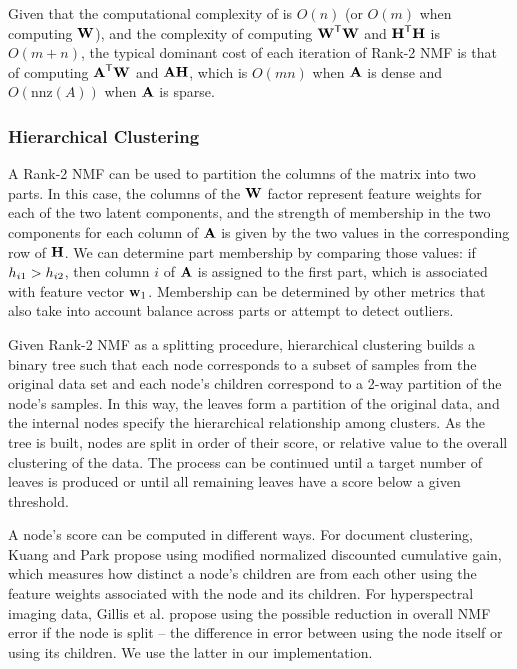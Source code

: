 \documentclass[conference,compsoc]{IEEEtran}
\begin{document}
Given that the computational complexity of  is $O(n)$ (or $O(m)$ when computing $\M{W}$), and the complexity of computing $\M{W}^\Tra\M{W}$ and $\M{H}^\Tra\M{H}$ is $O(m+n)$, the typical dominant cost of each iteration of Rank-2 NMF is that of computing $\M{A}^\Tra\M{W}$ and $\M{A}\M{H}$, which is $O(mn)$ when $\M{A}$ is dense and $O(\text{nnz}(A))$ when $\M{A}$ is sparse.

\subsubsection{Hierarchical Clustering}

A Rank-2 NMF can be used to partition the columns of the matrix into two parts.
In this case, the columns of the $\M{W}$ factor represent feature weights for each of the two latent components, and the strength of membership in the two components for each column of $\M{A}$ is given by the two values in the corresponding row of $\M{H}$.
We can determine part membership by comparing those values: if $\ME{H}{i1} > \ME{H}{i2}$, then column $i$ of $\M{A}$ is assigned to the first part, which is associated with feature vector $\V{w}_1$.
Membership can be determined by other metrics that also take into account balance across parts or attempt to detect outliers.

Given Rank-2 NMF as a splitting procedure, hierarchical clustering builds a binary tree such that each node corresponds to a subset of samples from the original data set and each node's children correspond to a 2-way partition of the node's samples.
In this way, the leaves form a partition of the original data, and the internal nodes specify the hierarchical relationship among clusters.
As the tree is built, nodes are split in order of their score, or relative value to the overall clustering of the data.
The process can be continued until a target number of leaves is produced or until all remaining leaves have a score below a given threshold.

A node's score can be computed in different ways.
For document clustering, Kuang and Park \cite{KP13} propose using modified normalized discounted cumulative gain, which measures how distinct a node's children are from each other using the feature weights associated with the node and its children.
For hyperspectral imaging data, Gillis et al. \cite{GKP15} propose using the possible reduction in overall NMF error if the node is split -- the difference in error between using the node itself or using its children.
We use the latter in our implementation.
\end{document}
